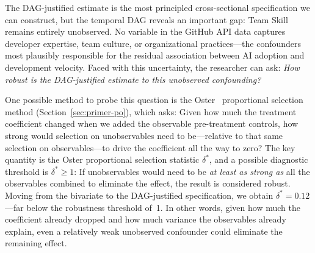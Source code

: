 The DAG-justified estimate is the most principled cross-sectional specification we can construct, but the temporal DAG reveals an important gap: Team Skill remains entirely unobserved.
No variable in the GitHub API data captures developer expertise, team culture, or organizational practices---the confounders most plausibly responsible for the residual association between AI adoption and development velocity.
Faced with this uncertainty, the researcher can ask: \emph{How robust is the DAG-justified estimate to this unobserved confounding?}

One possible method to probe this question is the Oster~\cite{oster2019unobservable} proportional selection method (Section~\ref{sec:primer-po}), which asks: Given how much the treatment coefficient changed when we added the observable pre-treatment controls, how strong would selection on unobservables need to be---relative to that same selection on observables---to drive the coefficient all the way to zero?
The key quantity is the Oster proportional selection statistic $\delta^*$, and a possible diagnostic threshold is $\delta^* \geq 1$: If unobservables would need to be \emph{at least as strong as} all the observables combined to eliminate the effect, the result is considered robust.
Moving from the bivariate to the DAG-justified specification, we obtain $\delta^* = 0.12$---far below the robustness threshold of~1.
In other words, given how much the coefficient already dropped and how much variance the observables already explain, even a relatively weak unobserved confounder could eliminate the remaining effect.
